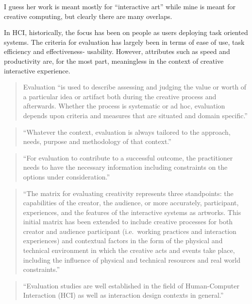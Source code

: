 \begin{fcom}
  I guess her work is meant mostly for ``interactive art'' while mine is meant for creative computing, but clearly there are many overlaps.
\end{fcom}

In HCI, historically, the focus has been on people as users deploying task oriented systems. The criteria for evaluation has largely been in terms of ease of use, task efficiency and effectiveness- usability. However, attributes such as speed and productivity are, for the most part, meaningless in the context of creative interactive experience. \parencite[p.23]{Candy2012}

\begin{quote}
  Evaluation ``is used to describe assessing and judging the value or worth of a particular idea or artifact both during the creative process and afterwards. Whether the process is systematic or ad hoc, evaluation depends upon criteria and measures that are situated and domain specific.'' \parencite[p.7]{Candy2012}
\end{quote}

\begin{quote}
  ``Whatever the context, evaluation is always tailored to the approach, needs, purpose and methodology of that context.'' \parencite[p.7]{Candy2012}
\end{quote}

\begin{quote}
  ``For evaluation to contribute to a successful outcome, the practitioner needs to have the necessary information including constraints on the options under consideration.'' \parencite[p.7]{Candy2012}
\end{quote}

\begin{quote}
  ``The matrix for evaluating creativity represents three standpoints: the capabilities of the creator, the audience, or more accurately, participant, experiences, and the features of the interactive systems as artworks. This initial matrix has been extended to include creative processes for both creator and audience participant (i.e.\ working practices and interaction experiences) and contextual factors in the form of the physical and technical environment in which the creative acts and events take place, including the influence of physical and technical resources and real world constraints.'' \parencite[p.7-8]{Candy2012}
\end{quote}

\begin{quote}
  ``Evaluation studies are well established in the field of Human-Computer Interaction (HCI) as well as interaction design contexts in general.'' \parencite[p.8]{Candy2012}
\end{quote}

